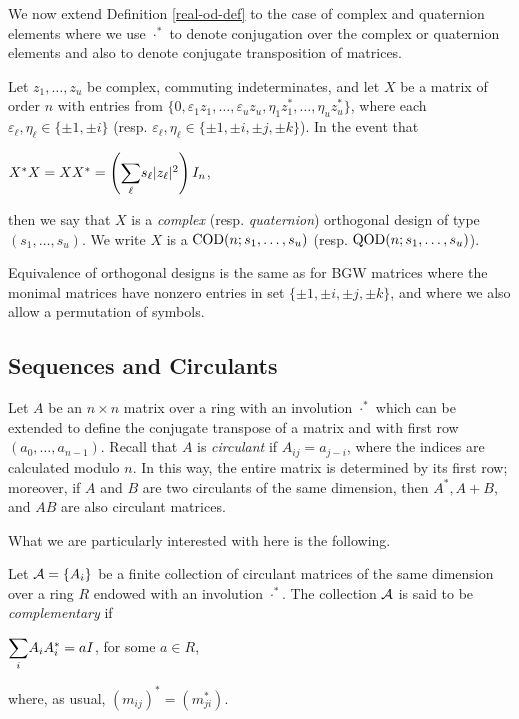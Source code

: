 \documentclass[../../../main]{subfiles}
\begin{document}
We now extend Definition \ref{real-od-def} to the case of complex and quaternion
elements where we use $\cdot^*$ to denote conjugation over the complex or
quaternion elements and also to denote conjugate transposition of matrices.

\begin{defin}
  Let $z_1, \dots, z_u$ be complex, commuting indeterminates, and let $X$ be a
  matrix of order $n$ with entries from $\{0,\varepsilon_1z_1, \dots, 
  \varepsilon_uz_u,\eta_1z_1^*, \dots, \eta_uz_u^*\}$, 
  where each $\varepsilon_\ell,\eta_\ell \in \{\pm 1, \pm i\}$ (resp.
  $\varepsilon_\ell,\eta_\ell \in \{\pm 1, \pm i, \pm j, \pm k\}$). In the event
  that  
  \begin{defenum}
  \item\label{qod-od-def} $X^*X=XX^* = \left( \ssum_\ell s_\ell|z_\ell|^2
    \right)I_n$, 
  \end{defenum}
  then we say that $X$ is a {\it complex} (resp. {\it quaternion}) orthogonal
  design of type $(s_1,\dots,s_u)$. We write $X$ is a $\text{COD}(n;s_1,\dots,s_u)$
  (resp. $\text{QOD}(n;s_1,\dots,s_u)$). 
\end{defin}

Equivalence of orthogonal designs is the same as for BGW matrices where the
monimal matrices have nonzero entries in set $\{\pm 1,\pm i,\pm j,\pm k\}$, and where we also
allow a permutation of symbols.

\dinkus


\subsection{Sequences and Circulants}

 Let $A$ be an $n \times n$ matrix over a ring with an involution $\cdot^*$
 which can be extended to define the conjugate transpose of a matrix and with
 first row $(a_0,\dots,a_{n-1})$. Recall 
 that $A$ is {\it circulant} if $A_{ij}=a_{j-i}$, where
 the indices are calculated modulo $n$. In this way, the entire matrix is
 determined by its first row; moreover, if $A$ and $B$ are two circulants of the
 same dimension, then $A^*,A+B$, and $AB$ are also circulant matrices. 

 What we are particularly interested with here is the following.
 
 \begin{defin}
  Let $\mathcal{A}=\{A_i\}$ be a finite collection of circulant matrices of the same
  dimension over a ring $R$ endowed with an involution $\cdot^*$.
  The collection $\mathcal{A}$ is said to be {\it complementary} if 
  \begin{defenum}
   \item $\ssum_i A_iA_i^* = aI$, for some $a \in R$,
  \end{defenum}
  where, as usual, $(m_{ij})^*=(m_{ji}^*)$.
 \end{defin}
 
\end{document}
